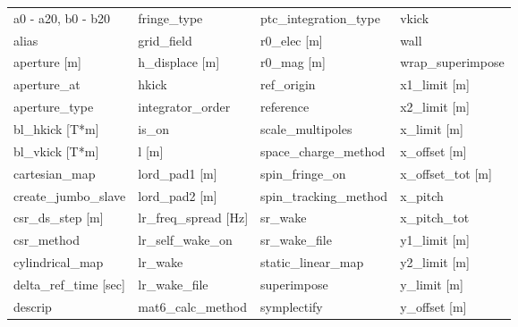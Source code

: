  \begin{tabular}{llll} \toprule
a0 - a20, b0 - b20               & fringe_type                      & ptc_integration_type             & vkick                            \\
alias                            & grid_field                       & r0_elec [m]                      & wall                             \\
aperture [m]                     & h_displace [m]                   & r0_mag [m]                       & wrap_superimpose                 \\
aperture_at                      & hkick                            & ref_origin                       & x1_limit [m]                     \\
aperture_type                    & integrator_order                 & reference                        & x2_limit [m]                     \\
bl_hkick [T*m]                   & is_on                            & scale_multipoles                 & x_limit [m]                      \\
bl_vkick [T*m]                   & l [m]                            & space_charge_method              & x_offset [m]                     \\
cartesian_map                    & lord_pad1 [m]                    & spin_fringe_on                   & x_offset_tot [m]                 \\
create_jumbo_slave               & lord_pad2 [m]                    & spin_tracking_method             & x_pitch                          \\
csr_ds_step [m]                  & lr_freq_spread [Hz]              & sr_wake                          & x_pitch_tot                      \\
csr_method                       & lr_self_wake_on                  & sr_wake_file                     & y1_limit [m]                     \\
cylindrical_map                  & lr_wake                          & static_linear_map                & y2_limit [m]                     \\
delta_ref_time [sec]             & lr_wake_file                     & superimpose                      & y_limit [m]                      \\
descrip                          & mat6_calc_method                 & symplectify                      & y_offset [m]                     \\

\end{tabular}
